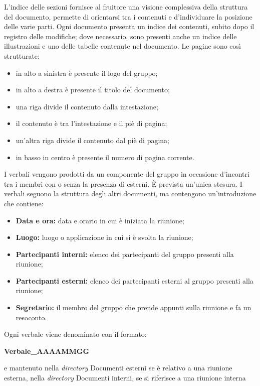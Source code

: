 L'indice delle sezioni fornisce al fruitore una visione complessiva della struttura del documento, permette di orientarsi tra i contenuti e d'individuare la posizione delle varie parti. Ogni documento presenta un indice dei contenuti, subito dopo il registro delle modifiche; dove necessario, sono presenti anche un indice delle illustrazioni e uno delle tabelle contenute nel documento.
Le pagine sono così strutturate:
\begin{itemize}
    \item in alto a sinistra è presente il logo del gruppo;
    \item in alto a destra è presente il titolo del documento;
    \item una riga divide il contenuto dalla intestazione;
    \item il contenuto è tra l'intestazione e il piè di pagina;
    \item un'altra riga divide il contenuto dal piè di pagina;
    \item in basso in centro è presente il numero di pagina corrente.
\end{itemize}
I verbali vengono prodotti da un componente del gruppo in occasione d'incontri tra i membri con o senza la presenza di esterni. È prevista un'unica stesura. I verbali seguono la struttura degli altri documenti, ma contengono un'introduzione che contiene:
\begin{itemize}
    \item \textbf{Data e ora:} data e orario in cui è iniziata la riunione;
    \item \textbf{Luogo:} luogo o applicazione in cui si è svolta la riunione;
    \item \textbf{Partecipanti interni:} elenco dei partecipanti del gruppo presenti alla riunione;
    \item \textbf{Partecipanti esterni:} elenco dei partecipanti esterni al gruppo presenti alla riunione;
    \item \textbf{Segretario:} il membro del gruppo che prende appunti sulla riunione e fa un resoconto.
\end{itemize}
Ogni verbale viene denominato con il formato:
\begin{center}
    \textbf{Verbale\_AAAAMMGG} \\
\end{center}
e mantenuto nella \textit{directory} Documenti esterni se è relativo a una riunione esterna, nella \textit{directory} Documenti interni, se si riferisce a una riunione interna
